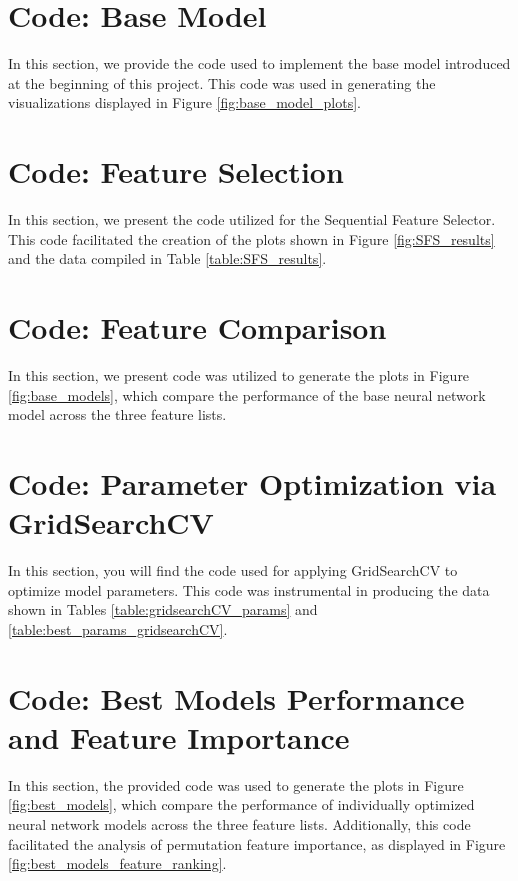\documentclass[]{article}
\begin{document}
\section{Code: Base Model}

In this section, we provide the code used to implement the base model introduced at the beginning of this project. This code was used in generating the visualizations displayed in Figure \ref{fig:base_model_plots}.



\section{Code: Feature Selection}\label{code_feat_selection}


In this section, we present the code utilized for the Sequential Feature Selector. This code facilitated the creation of the plots shown in Figure \ref{fig:SFS_results} and the data compiled in Table \ref{table:SFS_results}.



\section{Code: Feature Comparison}\label{code_feat_comparison}


In this section, we present code was utilized to generate the plots in Figure \ref{fig:base_models}, which compare the performance of the base neural network model across the three feature lists.



\section{Code: Parameter Optimization via GridSearchCV}\label{code_model_selection}

In this section, you will find the code used for applying GridSearchCV to optimize model parameters. This code was instrumental in producing the data shown in Tables \ref{table:gridsearchCV_params} and \ref{table:best_params_gridsearchCV}.



\section{Code: Best Models Performance and Feature Importance}\label{code_best_models}

In this section, the provided code was used to generate the plots in Figure \ref{fig:best_models}, which compare the performance of individually optimized neural network models across the three feature lists. Additionally, this code facilitated the analysis of permutation feature importance, as displayed in Figure \ref{fig:best_models_feature_ranking}.


\end{document}
